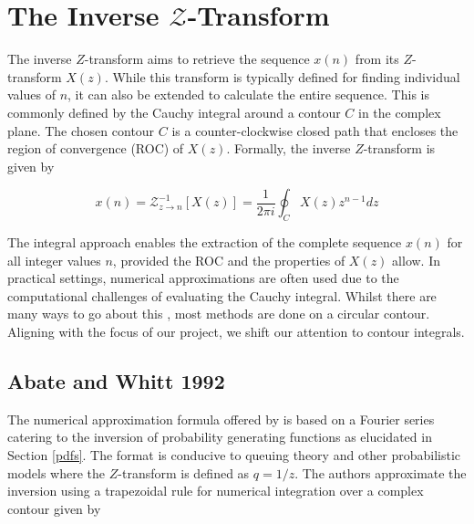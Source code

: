 \documentclass[a4paper]{report}
\begin{document}
\section{The Inverse \texorpdfstring{$\mathcal{Z}$}{Lg}-Transform}\label{section:inverse_z}
The inverse $Z$-transform aims to retrieve the sequence $x(n)$ from its $Z$-transform $X(z)$. While this transform is typically defined for finding individual values of $n$, it can also be extended to calculate the entire sequence. This is commonly defined by the Cauchy integral around a contour $C$ in the complex plane. The chosen contour $C$ is a counter-clockwise closed path that encloses the region of convergence (ROC) of $X(z)$. Formally, the inverse $Z$-transform is given by

\begin{equation}\label{inverse_z-transform}
	x(n) = \mathcal{Z}^{-1}_{z \rightarrow n}[X(z)] = \frac{1}{2\pi i} \oint_C X(z)z^{n-1}dz
\end{equation}

The integral approach enables the extraction of the complete sequence $x(n)$ for all integer values $n$, provided the ROC and the properties of $X(z)$ allow. In practical settings, numerical approximations are often used due to the computational challenges of evaluating the Cauchy integral. Whilst there are many ways to go about this \citep{merrikh2014linearsys, rajkovic2004method, horvath2020numerical}, most methods are done on a circular contour. Aligning with the focus of our project, we shift our attention to contour integrals.


\subsection{Abate and Whitt 1992}\label{section:abate_whitt}
The numerical approximation formula offered by \citet{AbateWhitt1992a, AbateWhitt1992b} is based on a Fourier series catering to the inversion of probability generating functions as elucidated in Section \ref{pdfs}. The format is conducive to queuing theory and other probabilistic models where the $Z$-transform is defined as $q = 1 / z$. The authors approximate the inversion using a trapezoidal rule for numerical integration over a complex contour given by
\end{document}
